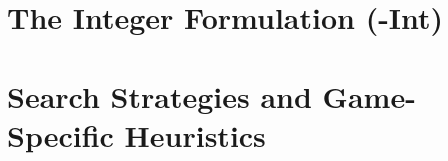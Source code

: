 \documentclass{article}
\begin{document}
\newpage

\begin{appendices}

\section{The Integer Formulation (\nooppc-Int)}\label{apx:integer}

\section{Search Strategies and Game-Specific Heuristics}\label{apx:heuristics}
\end{appendices}
\end{document}
